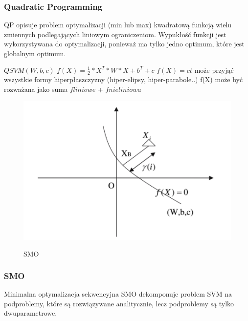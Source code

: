 \documentclass[[10pt,a4paper]{article}
\begin{document}
\subsubsection{Quadratic Programming}
QP opisuje problem optymalizacji (min lub max) kwadratową funkcją wielu zmiennych podlegających liniowym ograniczeniom. Wypukłość funkcji jest wykorzystywana do optymalizacji, ponieważ ma tylko jedno optimum, które jest globalnym optimum. 



$QSVM (W,b,c)$
$f(X)=\frac{1}{2}*X^T*W*X+b^T+c$
$f(X)=ct$ może przyjąć wszystkie formy hiperpłaszczyzny (hiper-elipsy, hiper-parabole..)
f(X) może być rozważana jako suma $fliniowe$ + $fnieliniowa$

\begin{figure}[h]
\centering
\includegraphics{3.png}\\
\caption{SMO}
\end{figure}
\subsubsection{SMO}
Minimalna optymalizacja sekwencyjna SMO dekomponuje problem SVM na podproblemy, które są rozwiązywane analitycznie, lecz podproblemy są tylko dwuparametrowe. 
\end{document}
